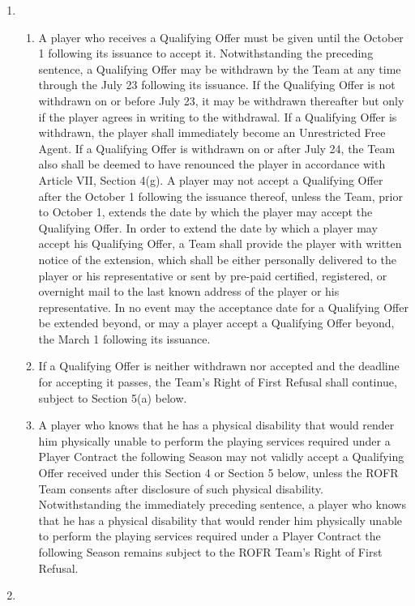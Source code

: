 \documentclass[
]{book}
\providecommand{\tightlist}{%
  \setlength{\itemsep}{0pt}\setlength{\parskip}{0pt}}
\begin{document}
\begin{enumerate}
\item
  \begin{enumerate}
  \def\labelenumii{(\roman{enumii})}
  \tightlist
  \item
    A player who receives a Qualifying Offer must be given until the October 1 following its issuance to accept it. Notwithstanding the preceding sentence, a Qualifying Offer may be withdrawn by the Team at any time through the July 23 following its issuance. If the Qualifying Offer is not withdrawn on or before July 23, it may be withdrawn thereafter but only if the player agrees in writing to the withdrawal. If a Qualifying Offer is withdrawn, the player shall immediately become an Unrestricted Free Agent. If a Qualifying Offer is withdrawn on or after July 24, the Team also shall be deemed to have renounced the player in accordance with Article VII, Section 4(g). A player may not accept a Qualifying Offer after the October 1 following the issuance thereof, unless the Team, prior to October 1, extends the date by which the player may accept the Qualifying Offer. In order to extend the date by which a player may accept his Qualifying Offer, a Team shall provide the player with written notice of the extension, which shall be either personally delivered to the player or his representative or sent by pre-paid certified, registered, or overnight mail to the last known address of the player or his representative. In no event may the acceptance date for a Qualifying Offer be extended beyond, or may a player accept a Qualifying Offer beyond, the March 1 following its issuance.
  \item
    If a Qualifying Offer is neither withdrawn nor accepted and the deadline for accepting it passes, the Team's Right of First Refusal shall continue, subject to Section 5(a) below.
  \item
    A player who knows that he has a physical disability that would render him physically unable to perform the playing services required under a Player Contract the following Season may not validly accept a Qualifying Offer received under this Section 4 or Section 5 below, unless the ROFR Team consents after disclosure of such physical disability. Notwithstanding the immediately preceding sentence, a player who knows that he has a physical disability that would render him physically unable to perform the playing services required under a Player Contract the following Season remains subject to the ROFR Team's Right of First Refusal.
  \end{enumerate}
\item

\end{enumerate}
\end{document}
